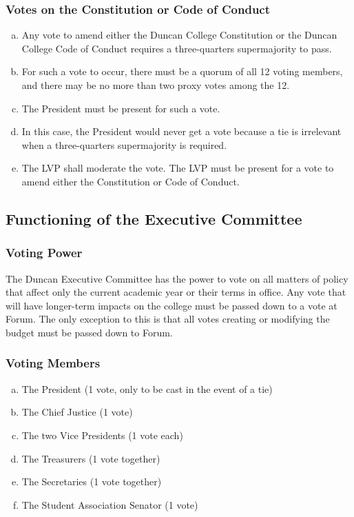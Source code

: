 \documentclass[USletter,12pt]{article}
\begin{document}
\subsubsection{Votes on the Constitution or Code of Conduct}
\begin{enumerate}[(a)]
\item Any vote to amend either the Duncan College Constitution or the Duncan College Code of Conduct requires a three-quarters supermajority to pass.
\item For such a vote to occur, there must be a quorum of all 12 voting members, and there may be no more than two proxy votes among the 12. 
\item The President must be present for such a vote.
\item In this case, the President would never get a vote because a tie is irrelevant when a three-quarters supermajority is required.
\item The LVP shall moderate the vote.  The LVP must be present for a vote to amend either the Constitution or Code of Conduct.
\end{enumerate}


\subsection{Functioning of the Executive Committee}


\subsubsection{Voting Power}
The Duncan Executive Committee has the power to vote on all matters of policy that affect only the current academic year or their terms in office. Any vote that will have longer-term impacts on the college must be passed down to a vote at Forum.  The only exception to this is that all votes creating or modifying the budget must be passed down to Forum.

\subsubsection{Voting Members}
\begin{enumerate}[(a)]
\item The President (1 vote, only to be cast in the event of a tie)
\item The Chief Justice (1 vote)
\item The two Vice Presidents (1 vote each)
\item The Treasurers (1 vote together)
\item The Secretaries (1 vote together)
\item The Student Association Senator (1 vote)
\end{enumerate}
\end{document}
